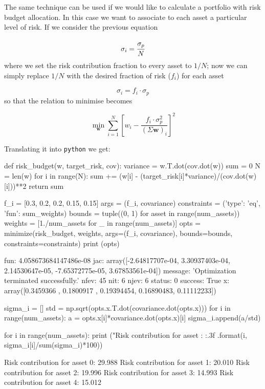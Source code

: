The same technique can be used if we would like to calculate a portfolio
with risk budget allocation. In this case we want to associate to each asset a particular level of risk. If we consider the previous equation

\begin{equation} 
\sigma _{i}=\cfrac{\sigma_p}{N} 
\end{equation}
where we set the risk contribution fraction to every asset to \(1/N\);
now we can simply replace \(1/N\) with the desired fraction of risk (\(f_i\)) for each asset

\begin{equation} 
\sigma _{i}=f_i \cdot \sigma_p 
\end{equation}
so that the relation to minimise becomes

\begin{equation} 
\underset{\mathbf{w}}{\min} \sum _{i=1}^{N}\left[w_{i}-{\frac {f_i \cdot \sigma_p^{2}}{(\Sigma \mathbf{w})_{i}}}\right]^{2} 
\end{equation}

Translating it into \texttt{python} we get:

\begin{ipython}
	def risk_budget(w, target_risk, cov):
	variance = w.T.dot(cov.dot(w))
	sum = 0
	N = len(w)
	for i in range(N):
	sum += (w[i] - (target_risk[i]*variance)/(cov.dot(w)[i]))**2
	return sum
	
	f_i = [0.3, 0.2, 0.2, 0.15, 0.15]
	args = (f_i, covariance)
	constraints = ({'type': 'eq', 'fun': sum_weights})
	bounds = tuple((0, 1) for asset in range(num_assets))
	weights = [1./num_assets for _ in range(num_assets)]
	opts = minimize(risk_budget, weights, args=(f_i, covariance),
	bounds=bounds, constraints=constraints)
	print (opts)
\end{ipython}
\begin{ioutput}
	fun: 4.058673684147486e-08
	jac: array([-2.64817707e-04,  3.30937403e-04,  2.14530647e-05, 
	-7.65372775e-05,  3.67853561e-04])
	message: 'Optimization terminated successfully.'
	nfev: 45
	nit: 6
	njev: 6
	status: 0
	success: True
	x: array([0.3459366 , 0.1800917 , 0.19394454, 0.16890483, 
	0.11112233])
\end{ioutput}
\begin{ipython}  
	sigma_i = []
	std = np.sqrt(opts.x.T.dot(covariance.dot(opts.x)))
	for i in range(num_assets):
	a = opts.x[i]*covariance.dot(opts.x)[i]
	sigma_i.append(a/std)
	
	for i in range(num_assets):
	print ("Risk contribution for asset {}: {:.3f}%
	.format(i, sigma_i[i]/sum(sigma_i)*100))    
\end{ipython}
\begin{ioutput}
	Risk contribution for asset 0: 29.988%
	Risk contribution for asset 1: 20.010%
	Risk contribution for asset 2: 19.996%
	Risk contribution for asset 3: 14.993%
	Risk contribution for asset 4: 15.012%
\end{ioutput}


